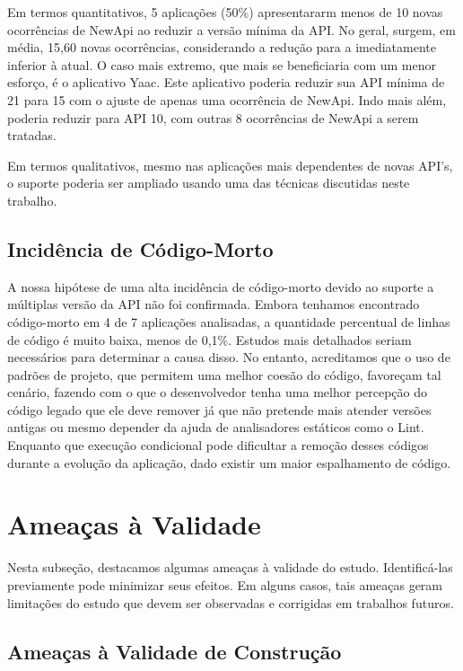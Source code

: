 Em termos quantitativos, 5 aplicações (50\%) apresentararm menos de 10 novas ocorrências 
de NewApi ao reduzir a versão mínima da API. No geral, surgem, em média, 15,60 novas
ocorrências, considerando a redução para a imediatamente inferior à atual. O caso mais
extremo, que mais se beneficiaria com um menor esforço, é o aplicativo Yaac. Este aplicativo
poderia reduzir sua API mínima de 21 para 15 com o ajuste de apenas uma ocorrência de NewApi.
Indo mais além, poderia reduzir para API 10, com outras 8 ocorrências de NewApi a serem tratadas.

Em termos qualitativos, mesmo nas aplicações mais dependentes de novas API's, o suporte
poderia ser ampliado usando uma das técnicas discutidas neste trabalho.

\subsection{Incidência de Código-Morto} \label{subsec:codigo_morto}

A nossa hipótese de uma alta incidência de código-morto devido ao suporte a múltiplas
versão da API não foi confirmada. Embora tenhamos encontrado código-morto em 4 de 7
aplicações analisadas, a quantidade percentual de linhas de código é muito baixa,
menos de 0,1\%. Estudos mais detalhados seriam necessários para determinar a causa
disso. No entanto, acreditamos que o uso de padrões de projeto, que permitem uma melhor
coesão do código, favoreçam tal cenário, fazendo com o que o desenvolvedor tenha uma melhor
percepção do código legado que ele deve remover já que não pretende mais atender versões
antigas ou mesmo depender da ajuda de analisadores estáticos como o Lint. Enquanto que
execução condicional pode dificultar a remoção desses códigos durante a evolução da
aplicação, dado existir um maior espalhamento de código.

\section{Ameaças à Validade} \label{sec:ameacas}

Nesta subseção, destacamos algumas ameaças à validade do estudo. Identificá-las
previamente pode minimizar seus efeitos.  Em alguns casos, tais ameaças geram
limitações do estudo que devem ser observadas e corrigidas em trabalhos futuros.

\subsection{Ameaças à Validade de Construção} \label{subsec:ameacas_validade}

